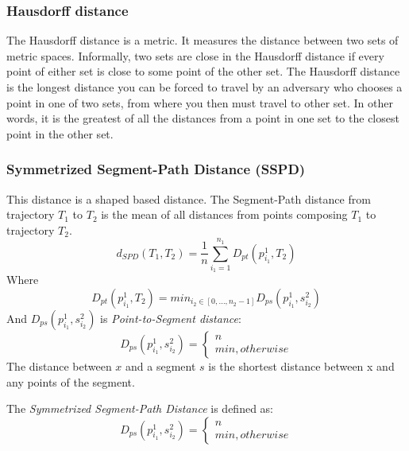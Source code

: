\documentclass[a4paper, 12pt]{article}
\begin{document}
\subsubsection{Hausdorff distance}
The Hausdorff distance is a metric. It measures the distance between two sets of metric spaces. Informally, two sets are close in the Hausdorff distance if every point of either set is close to some point of the other set. The Hausdorff distance is the longest distance you can be forced to travel by an adversary who chooses a point in one of two sets, from where you then must travel to other set. In other words, it is the greatest of all the distances from a point in one set to the closest point in the other set.

\subsubsection{Symmetrized Segment-Path Distance (SSPD)}
This distance is a shaped based distance. The Segment-Path distance from trajectory $T_{1}$ to $T_{2}$ is the mean of all distances from points composing $T_{1}$ to trajectory $T_{2}$.
\begin{equation} \label{eq7}
    d_{SPD}(T_{1},T_{2}) = \frac{1}{n} \sum_{i_{1}=1}^{n_{1}}D_{pt}(p_{i_{1}}^1, T_{2})
\end{equation}
Where
\begin{equation} \label{eq8}
    D_{pt}(p_{i_{1}}^1, T_{2}) = min_{i_{2} \in [0,\dots,n_{2}-1]}D_{ps}(p_{i_{1}}^1, s_{i_{2}}^2)
\end{equation}
And $D_{ps}(p_{i_{1}}^1, s_{i_{2}}^2)$ is \textit{Point-to-Segment distance}:
\begin{equation} \label{eq9}
    D_{ps}(p_{i_{1}}^1, s_{i_{2}}^2) = \begin{cases}
                                            n \\
                                            min, otherwise 
                                        \end{cases}
\end{equation}
The distance between $x$ and a segment $s$ is the shortest distance between x and any points of the segment.

The \textit{Symmetrized Segment-Path Distance} is defined as:
\begin{equation} \label{eq9}
    D_{ps}(p_{i_{1}}^1, s_{i_{2}}^2) = \begin{cases}
                                            n \\
                                            min, otherwise 
                                        \end{cases}
\end{equation}
\end{document}
